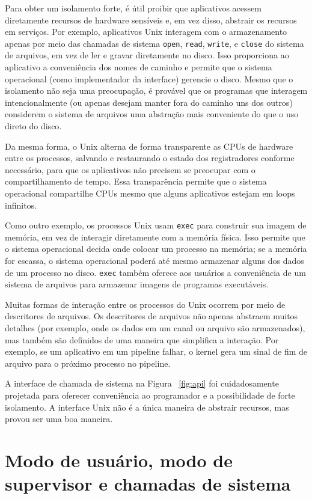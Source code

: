 Para obter um isolamento forte, é útil proibir que aplicativos acessem diretamente recursos de hardware sensíveis e, em vez disso, abstrair os recursos em serviços. Por exemplo, aplicativos Unix interagem com o armazenamento apenas por meio das chamadas de sistema
\lstinline{open},
\lstinline{read},
\lstinline{write}, 
e
\lstinline{close}
do sistema de arquivos,
em vez de ler e gravar diretamente no disco. 
Isso proporciona ao aplicativo a conveniência dos nomes de caminho e permite que
o sistema operacional (como implementador da interface) gerencie o disco. 
Mesmo que o isolamento não seja uma preocupação, é provável que os programas
que interagem intencionalmente (ou apenas desejam manter
fora do caminho uns dos outros) considerem o sistema de arquivos uma abstração
mais conveniente do que o uso direto do disco.

Da mesma forma, o Unix alterna de forma transparente as CPUs de hardware entre os processos,
salvando e restaurando o estado dos registradores conforme necessário,
para que os aplicativos não precisem se preocupar com o compartilhamento de tempo. 
Essa transparência permite que o sistema operacional compartilhe
CPUs mesmo que alguns aplicativos estejam em loops infinitos.

Como outro exemplo, os processos Unix usam 
\lstinline{exec}
para construir sua imagem de memória, em vez de interagir diretamente com a memória física. 
Isso permite que o sistema operacional decida onde colocar um processo na memória; 
se a memória for escassa, o sistema operacional poderá até mesmo armazenar alguns dos
dados de um processo no disco.
\lstinline{exec}
também oferece aos usuários a conveniência de um sistema de arquivos
para armazenar imagens de programas executáveis.  

Muitas formas de interação entre os processos do Unix ocorrem por meio de descritores de arquivos.
Os descritores de arquivos não apenas abstraem muitos detalhes
(por exemplo, onde os dados em um canal ou arquivo são armazenados), 
mas também são definidos de uma maneira que simplifica a interação.
Por exemplo, se um aplicativo em um pipeline falhar, o kernel
gera um sinal de fim de arquivo para o próximo processo no pipeline.

A interface de chamada de sistema na Figura ~\ref{fig:api}
foi cuidadosamente projetada para oferecer conveniência ao programador e
a possibilidade de forte isolamento. A interface Unix
não é a única maneira de abstrair recursos, mas provou ser uma boa
maneira.

\section{Modo de usuário, modo de supervisor e chamadas de sistema}

